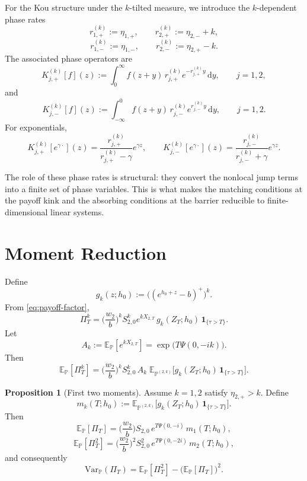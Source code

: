 \documentclass{article}
\newcommand{\E}{\mathbb{E}}
\renewcommand{\P}{\mathbb{P}}
\newcommand{\diff}{\mathrm{d}}
\newcommand{\one}{\mathbf{1}}
\theoremstyle{definition}
\newtheorem{proposition}{Proposition}[section]
\begin{document}
For the Kou structure under the $k$-tilted measure, we introduce the $k$-dependent phase rates
\[
r_{1,+}^{(k)}:=\eta_{1,+},
\qquad
r_{2,+}^{(k)}:=\eta_{2,-}+k,
\]
\[
r_{1,-}^{(k)}:=\eta_{1,-},
\qquad
r_{2,-}^{(k)}:=\eta_{2,+}-k.
\]
The associated phase operators are
\[
K_{j,+}^{(k)}[f](z)
:=
\int_0^\infty f(z+y)\,r_{j,+}^{(k)}e^{-r_{j,+}^{(k)}y}\,\diff y,
\qquad j=1,2,
\]
and
\[
K_{j,-}^{(k)}[f](z)
:=
\int_{-\infty}^0 f(z+y)\,r_{j,-}^{(k)}e^{r_{j,-}^{(k)}y}\,\diff y,
\qquad j=1,2.
\]
For exponentials,
\begin{equation}\label{eq:phase-on-exp}
\boxed{
K_{j,+}^{(k)}[e^{\gamma\cdot}](z)
=
\frac{r_{j,+}^{(k)}}{r_{j,+}^{(k)}-\gamma}e^{\gamma z},
\qquad
K_{j,-}^{(k)}[e^{\gamma\cdot}](z)
=
\frac{r_{j,-}^{(k)}}{r_{j,-}^{(k)}+\gamma}e^{\gamma z}.
}
\end{equation}

The role of these phase rates is structural: they convert the nonlocal jump terms into a finite set of phase variables.
This is what makes the matching conditions at the payoff kink and the absorbing conditions at the barrier reducible to
finite-dimensional linear systems.

\section{Moment Reduction}

Define
\[
g_k(z;h_0):=\big((e^{h_0+z}-b)^+\big)^k.
\]
From \eqref{eq:payoff-factor},
\[
\Pi_T^k
=
\Big(\frac{w_2}{b}\Big)^k S_{2,0}^k e^{kX_{2,T}}\,g_k(Z_T;h_0)\,\one_{\{\tau>T\}}.
\]
Let
\[
A_k:=\E_{\P}[e^{kX_{2,T}}]=\exp\!\big(T\Psi(0,-ik)\big).
\]
Then
\begin{equation}\label{eq:moment-reduction}
\boxed{
\E_{\P}[\Pi_T^k]
=
\Big(\frac{w_2}{b}\Big)^k S_{2,0}^k\,A_k\;
\E_{\P^{(2,k)}}\!\Big[g_k(Z_T;h_0)\,\one_{\{\tau>T\}}\Big].
}
\end{equation}

\begin{proposition}[First two moments]\label{prop:first-two-moments}
Assume $k=1,2$ satisfy $\eta_{2,+}>k$. Define
\[
m_k(T;h_0):=\E_{\P^{(2,k)}}\!\Big[g_k(Z_T;h_0)\,\one_{\{\tau>T\}}\Big].
\]
Then
\[
\E_{\P}[\Pi_T]=\Big(\frac{w_2}{b}\Big) S_{2,0}\,e^{T\Psi(0,-i)}\,m_1(T;h_0),
\]
\[
\E_{\P}[\Pi_T^2]=\Big(\frac{w_2}{b}\Big)^2 S_{2,0}^2\,e^{T\Psi(0,-2i)}\,m_2(T;h_0),
\]
and consequently
\[
\mathrm{Var}_{\P}(\Pi_T)=\E_{\P}[\Pi_T^2]-\big(\E_{\P}[\Pi_T]\big)^2.
\]
\end{proposition}
\end{document}
